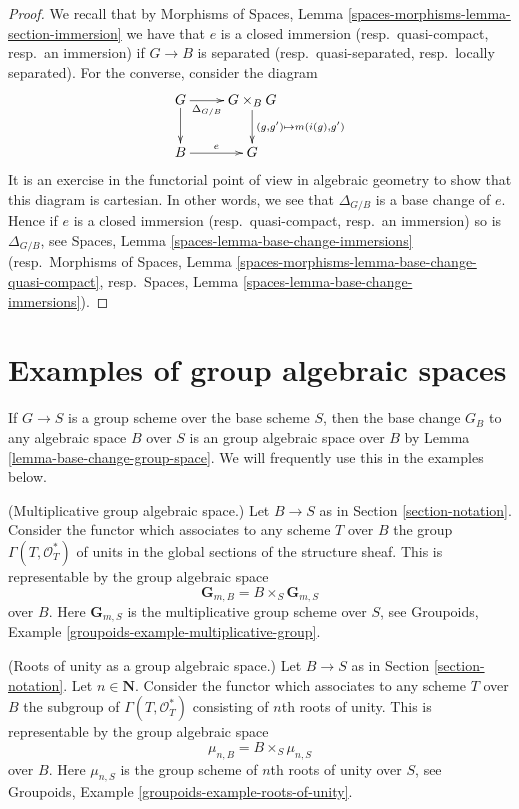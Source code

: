 \begin{proof}
We recall that by
Morphisms of Spaces, Lemma \ref{spaces-morphisms-lemma-section-immersion}
we have that $e$ is a closed immersion (resp.\ quasi-compact, resp.\ an
immersion) if $G \to B$ is separated (resp.\ quasi-separated, resp.\ locally
separated).
For the converse, consider the diagram
$$
\xymatrix{
G \ar[r]_-{\Delta_{G/B}} \ar[d] &
G \times_B G \ar[d]^{(g, g') \mapsto m(i(g), g')} \\
B \ar[r]^e & G
}
$$
It is an exercise in the functorial point of view in algebraic geometry
to show that this diagram is cartesian. In other words, we see that
$\Delta_{G/B}$ is a base change of $e$. Hence if $e$ is a
closed immersion (resp.\ quasi-compact, resp.\ an immersion) so is
$\Delta_{G/B}$, see
Spaces, Lemma \ref{spaces-lemma-base-change-immersions}
(resp.\ Morphisms of Spaces, Lemma
\ref{spaces-morphisms-lemma-base-change-quasi-compact},
resp.\ Spaces, Lemma \ref{spaces-lemma-base-change-immersions}).
\end{proof}











\section{Examples of group algebraic spaces}
\label{section-examples-group-spaces}

\noindent
If $G \to S$ is a group scheme over the base scheme $S$, then the base
change $G_B$ to any algebraic space $B$ over $S$ is an group algebraic
space over $B$ by
Lemma \ref{lemma-base-change-group-space}.
We will frequently use this in the examples below.

\begin{example}
\label{example-multiplicative-group}
(Multiplicative group algebraic space.)
Let $B \to S$ as in Section \ref{section-notation}.
Consider the functor which associates to any scheme $T$ over
$B$ the group $\Gamma(T, \mathcal{O}_T^*)$
of units in the global sections of the structure sheaf.
This is representable by the group algebraic space
$$
\mathbf{G}_{m, B} = B \times_S \mathbf{G}_{m, S}
$$
over $B$. Here $\mathbf{G}_{m, S}$ is the multiplicative group scheme
over $S$, see
Groupoids, Example \ref{groupoids-example-multiplicative-group}.
\end{example}

\begin{example}
\label{example-roots-of-unity}
(Roots of unity as a group algebraic space.)
Let $B \to S$ as in Section \ref{section-notation}.
Let $n \in \mathbf{N}$. Consider the functor which associates
to any scheme $T$ over $B$ the subgroup of $\Gamma(T, \mathcal{O}_T^*)$
consisting of $n$th roots of unity.
This is representable by the group algebraic space
$$
\mu_{n, B} = B \times_S \mu_{n, S}
$$
over $B$. Here $\mu_{n, S}$ is the group scheme of $n$th roots of
unity over $S$, see
Groupoids, Example \ref{groupoids-example-roots-of-unity}.
\end{example}

